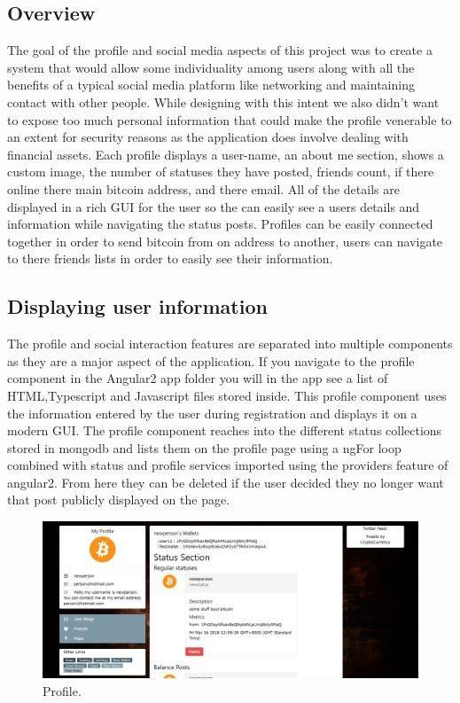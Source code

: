 \subsection{Overview}
The goal of the profile and social media aspects of this project was to create a system that would allow some individuality among users along with all the benefits of a typical social media platform like networking and maintaining contact with other people. While designing with this intent we also didn't want to expose too much personal information that could make the profile venerable to an extent for security reasons as the application does involve dealing with financial assets. Each profile displays a user-name, an about me section, shows a custom image, the number of statuses they have posted, friends count, if there online there main bitcoin address, and there email. All of the details are displayed in a rich GUI for the user so the can easily see a users details and information while navigating the status posts. Profiles can be easily connected together in order to send bitcoin from on address to another, users can navigate to there friends lists in order to easily see their information.

\subsection{Displaying user information}
The profile and social interaction features are separated into multiple components as they are a major aspect of the application. If you navigate to the profile component in the Angular2 app folder you will  in the app see a list of HTML,Typescript and Javascript files stored inside. This profile component uses the information entered by the user during registration and displays it on a modern GUI. The profile component reaches into the different status collections stored in mongodb and lists them on the profile page using a ngFor loop combined with status and profile services imported using the providers feature of angular2. From here they can be deleted if the user decided they no longer want that post publicly displayed on the page.

\begin{figure}[H]
\centering
\includegraphics[]{img/UserProfile.png}
\caption{Profile.}
\end{figure}

